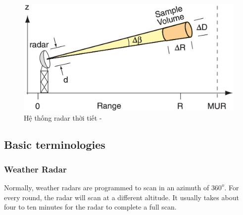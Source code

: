 
\vspace{2cm}
\begin{figure}[H]
    \centering
    \includegraphics[width=1\linewidth]{Images/radar_concept.png}
    \vspace{1em}
    \caption{Hệ thống radar thời tiết - \cite{2022Weather}}
    \label{fig:radar}
\end{figure}
\newpage
\subsection{Basic terminologies}


\subsubsection{Weather Radar}

Normally, weather radars are programmed to scan in an azimuth of $360^o$.
For every round, the radar will scan at a different altitude.
It usually takes about four to ten minutes for the radar to complete a full scan.

